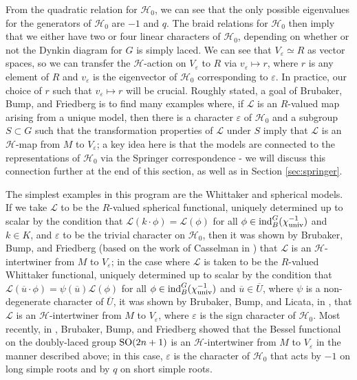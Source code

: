 \documentclass[11pt,letterpaper]{article}
\newcommand{\calL}{\mathcal{L}} %
\newcommand{\calH}{\mathcal{H}} %
\newcommand{\ve}{\varepsilon}
\newcommand{\SO}{\textup{SO}}
\newcommand{\ind}{\textup{ind}}
\theoremstyle{remark}
\numberwithin{equation}{section}
\begin{document}
From the quadratic relation for $\calH_0$, we can see that the only possible eigenvalues for the generators of $\calH_0$ are $-1$ and $q$. The braid relations for $\calH_0$ then imply that we either have two or four linear characters of $\calH_0$, depending on whether or not the Dynkin diagram for $G$ is simply laced. We can see that $V_{\ve} \simeq R$ as vector spaces, so we can transfer the $\calH$-action on $V_{\ve}$ to $R$ via $v_{\ve} \mapsto r$, where $r$ is any element of $R$ and $v_{\ve}$ is the eigenvector of $\calH_0$ corresponding to $\ve$. In practice, our choice of $r$ such that $v_{\ve} \mapsto r$ will be crucial. Roughly stated, a goal of Brubaker, Bump, and Friedberg is to find many examples where, if $\calL$ is an $R$-valued map arising from a unique model, then there is a character $\ve$ of $\calH_0$ and a subgroup $S \subset G$ such that the transformation properties of $\calL$ under $S$ imply that $\calL$ is an $\calH$-map from $M$ to $V_{\ve}$; a key idea here is that the models are connected to the representations of $\calH_0$ via the Springer correspondence - we will discuss this connection further at the end of this section, as well as in Section \ref{sec:springer}.

The simplest examples in this program are the Whittaker and spherical models. If we take $\calL$ to be the $R$-valued spherical functional, uniquely determined up to scalar by the condition that $\calL(k\cdot \phi) = \calL(\phi)$ for all $\phi \in \ind_B^G(\chi_{\textup{univ}}^{-1})$ and $k \in K$, and $\ve$ to be the trivial character on $\calH_0$, then it was shown by Brubaker, Bump, and Friedberg (based on the work of Casselman in \cite{Cas}) that $\calL$ is an $\calH$-intertwiner from $M$ to $V_{\ve}$; in the case where $\calL$ is taken to be the $R$-valued Whittaker functional, uniquely determined up to scalar by the condition that $\calL(\overline{u}\cdot \phi) = \psi(\overline{u})\calL(\phi)$ for all $\phi \in \ind_B^G(\chi_{\textup{univ}}^{-1})$ and $\overline{u} \in \overline{U}$, where $\psi$ is a non-degenerate character of $\overline{U}$, it was shown by Brubaker, Bump, and Licata, in \cite{BBL}, that $\calL$ is an $\calH$-intertwiner from $M$ to $V_{\ve}$, where $\ve$ is the sign character of $\calH_0$. Most recently, in \cite{BBF2}, Brubaker, Bump, and Friedberg showed that the Bessel functional on the doubly-laced group $\SO(2n+1)$ is an $\calH$-intertwiner from $M$ to $V_{\ve}$  in the manner described above; in this case, $\ve$ is the character of $\calH_0$ that acts by $-1$ on long simple roots and by $q$ on short simple roots.
\end{document}
